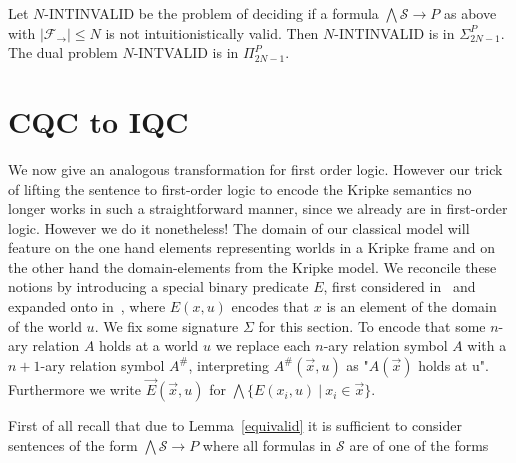 \documentclass[a4paper,UKenglish,cleveref, autoref, thm-restate]{lipics-v2021}
\begin{document}
\begin{corollary}
	Let $N$-INTINVALID be the problem of deciding if a formula $\bigwedge \mathcal S\to P$ as above with $|\mathcal F_\to|\leq N$ is not intuitionistically valid. Then $N$-INTINVALID is in $\Sigma_{2N-1}^P$. The dual problem $N$-INTVALID is in $\Pi_{2N-1}^P$.
\end{corollary}

\section{CQC to IQC}

We now give an analogous transformation for first order logic. However our trick of lifting the sentence to first-order logic to encode the Kripke semantics no longer works in such a straightforward manner, since we already are in first-order logic. However we do it nonetheless! The domain of our classical model will feature on the one hand elements representing worlds in a Kripke frame and on the other hand the domain-elements from the Kripke model. We reconcile these notions by introducing a special binary predicate $E$, first considered in~\cite{baaz2006skolemization} and expanded onto in~\cite{iemhoff2010eskolemization}, where $E(x, u)$ encodes that $x$ is an element of the domain of the world $u$. We fix some signature $\Sigma$ for this section. To encode that some $n$-ary relation $A$ holds at a world $u$ we replace each $n$-ary relation symbol $A$ with a $n+1$-ary relation symbol $A^\#$, interpreting $A^\#(\vec x, u)$ as "$A(\vec x)$ holds at u". Furthermore we write $\vec E(\vec x, u)$ for $\bigwedge\{E(x_i, u)\:|\:x_i\in \vec x\}$. 

First of all recall that due to Lemma~\ref{equivalid} it is sufficient to consider sentences of the form $\bigwedge\mathcal S\to P$ where all formulas in $\mathcal S$ are of one of the forms
\end{document}
